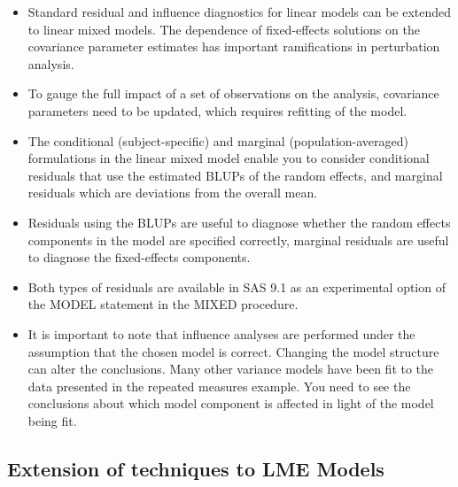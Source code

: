 \documentclass[12pt, a4paper]{article}
\begin{document}
\begin{itemize}
	\item Standard residual and inﬂuence diagnostics for linear models can be extended to linear mixed models. The dependence of ﬁxed-effects solutions on the covariance parameter estimates has important ramiﬁcations in perturbation analysis. 
	\item To gauge the full impact of a set of observations on the analysis, covariance parameters need to be updated, which requires reﬁtting of the model. 
	
	\item The conditional (subject-speciﬁc) and marginal (population-averaged) formulations in the linear mixed model enable you to consider conditional residuals that use the estimated BLUPs of the random effects, and marginal residuals which are deviations from the overall mean. 
	\item Residuals using the BLUPs are useful to diagnose whether the random effects components in the model are speciﬁed correctly, marginal residuals are useful to diagnose the ﬁxed-effects components. 
	\item Both types of residuals are available in SAS 9.1 as an experimental option of the MODEL statement in the MIXED procedure.
	
	\item It is important to note that influence analyses are performed under the assumption that the chosen model is correct. Changing the model structure can alter the conclusions. Many other variance models have been ﬁt to the data presented in the repeated measures example. You need to see the conclusions about which model component is affected in light of the model being fit.
\end{itemize}





\subsection*{Extension of techniques to LME Models} %
			
\end{document}
